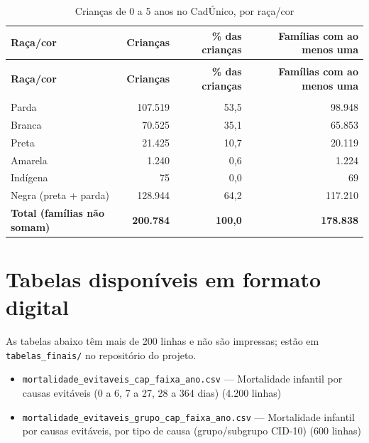 \begin{apendicesenv}
{\small\setlength{\tabcolsep}{5pt}
\begin{longtable}{@{}>{\raggedright\arraybackslash}p{3.6cm}rrr@{}}
\caption{Crianças de 0 a 5 anos no CadÚnico, por raça/cor}\label{tab:cadunico-por-raca-cor-2026}\\
\toprule \textbf{Raça/cor} & \textbf{Crianças} & \parbox[b]{2.20cm}{\raggedleft{} \textbf{\% das crianças}} & \parbox[b]{2.20cm}{\raggedleft{} \textbf{Famílias com ao menos uma}} \\ \midrule \endfirsthead
{}\\ \toprule \textbf{Raça/cor} & \textbf{Crianças} & \parbox[b]{2.20cm}{\raggedleft{} \textbf{\% das crianças}} & \parbox[b]{2.20cm}{\raggedleft{} \textbf{Famílias com ao menos uma}} \\ \midrule \endhead
\midrule {}\\ \endfoot
\bottomrule \endlastfoot
Parda & 107.519 & 53,5 & 98.948 \\
Branca & 70.525 & 35,1 & 65.853 \\
Preta & 21.425 & 10,7 & 20.119 \\
Amarela & 1.240 & 0,6 & 1.224 \\
Indígena & 75 & 0,0 & 69 \\
Negra (preta + parda) & 128.944 & 64,2 & 117.210 \\
\textbf{Total (famílias não somam)} & \textbf{200.784} & \textbf{100,0} & \textbf{178.838} \\
\end{longtable}}
\vspace{-6pt}


\section*{Tabelas disponíveis em formato digital}

{\raggedright As tabelas abaixo têm mais de 200 linhas e não são impressas; estão em \texttt{tabelas\_finais/} no repositório do projeto.\par}

\begin{itemize}\raggedright\item \texttt{mortalidade\_\allowbreak{}evitaveis\_\allowbreak{}cap\_\allowbreak{}faixa\_\allowbreak{}ano.csv} --- Mortalidade infantil por causas evitáveis (0 a 6, 7 a 27, 28 a 364 dias) (4.200 linhas)\item \texttt{mortalidade\_\allowbreak{}evitaveis\_\allowbreak{}grupo\_\allowbreak{}cap\_\allowbreak{}faixa\_\allowbreak{}ano.csv} --- Mortalidade infantil por causas evitáveis, por tipo de causa (grupo/subgrupo CID-10) (600 linhas)\end{itemize}


\end{apendicesenv}
